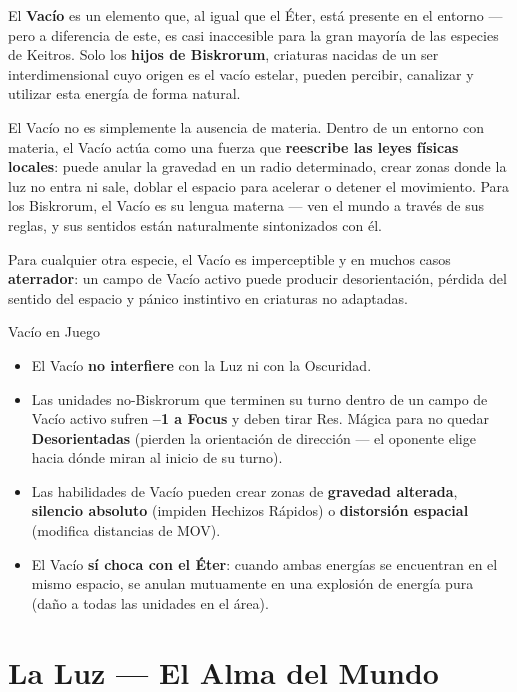 \vspace{0.3cm}

El \textbf{Vacío} es un elemento que, al igual que el Éter, está presente en el entorno — pero a diferencia de este, es casi inaccesible para la gran mayoría de las especies de Keitros. Solo los \textbf{hijos de Biskrorum}, criaturas nacidas de un ser interdimensional cuyo origen es el vacío estelar, pueden percibir, canalizar y utilizar esta energía de forma natural.

El Vacío no es simplemente la ausencia de materia. Dentro de un entorno con materia, el Vacío actúa como una fuerza que \textbf{reescribe las leyes físicas locales}: puede anular la gravedad en un radio determinado, crear zonas donde la luz no entra ni sale, doblar el espacio para acelerar o detener el movimiento. Para los Biskrorum, el Vacío es su lengua materna — ven el mundo a través de sus reglas, y sus sentidos están naturalmente sintonizados con él.

Para cualquier otra especie, el Vacío es imperceptible y en muchos casos \textbf{aterrador}: un campo de Vacío activo puede producir desorientación, pérdida del sentido del espacio y pánico instintivo en criaturas no adaptadas.

\begin{reglaespecial}{Vacío en Juego}
\begin{itemize}
    \item El Vacío \textbf{no interfiere} con la Luz ni con la Oscuridad.
    \item Las unidades no-Biskrorum que terminen su turno dentro de un campo de Vacío activo sufren \textbf{--1 a Focus} y deben tirar Res. Mágica para no quedar \textbf{Desorientadas} (pierden la orientación de dirección — el oponente elige hacia dónde miran al inicio de su turno).
    \item Las habilidades de Vacío pueden crear zonas de \textbf{gravedad alterada}, \textbf{silencio absoluto} (impiden Hechizos Rápidos) o \textbf{distorsión espacial} (modifica distancias de MOV).
    \item El Vacío \textbf{sí choca con el Éter}: cuando ambas energías se encuentran en el mismo espacio, se anulan mutuamente en una explosión de energía pura (daño a todas las unidades en el área).
\end{itemize}
\end{reglaespecial}

\section{La Luz — El Alma del Mundo}

